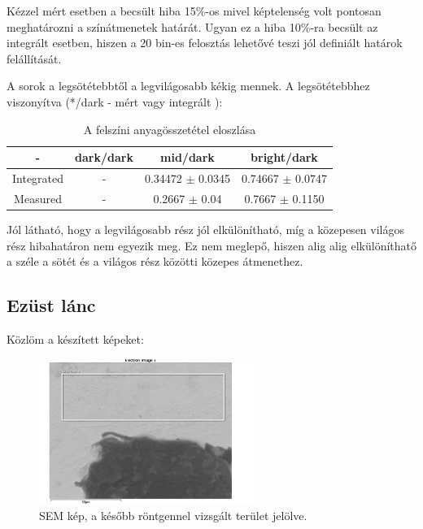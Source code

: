 \documentclass[a4paper,12pt]{article}
\begin{document}
\par Kézzel mért esetben a becsült hiba 15\%-os mivel képtelenség volt
pontosan meghatározni a színátmenetek határát. Ugyan ez a hiba 10\%-ra becsült
az integrált esetben, hiszen a 20 bin-es felosztás lehetővé teszi jól definiált határok
felállítását.

\par A sorok a legsötétebbtől a legvilágosabb kékig mennek. A legsötétebbhez
viszonyítva (*/dark - mért vagy integrált ):

\begin{table}[H]
	\centering
	\begin{tabular}{|c|c|c|c|}  \hline
		- & dark/dark & mid/dark & bright/dark \\ \hline
		Integrated  & - & 0.34472 $\pm$ 0.0345 & 0.74667 $\pm$ 0.0747 \\ \hline
		Measured & - & 0.2667 $\pm$ 0.04 & 0.7667 $\pm$ 0.1150 \\ \hline
	\end{tabular}
	\caption{A felszíni anyagösszetétel eloszlása}
	\label{my-label}
\end{table}

\par Jól látható, hogy a legvilágosabb rész jól elkülönítható, míg a 
közepesen világos rész hibahatáron nem egyezik meg. Ez nem meglepő, hiszen
alig alig elkülöníthatő a széle a sötét és a világos rész közötti közepes
átmenethez.

\subsection{Ezüst lánc}

\par Közlöm a készített képeket:

\begin{figure}[H]
	\centering
	\includegraphics[width=0.62\textwidth]{./Jcsop/lanc.png}
	\caption{SEM kép, a később röntgennel vizsgált terület jelölve.}
\end{figure}
\end{document}
